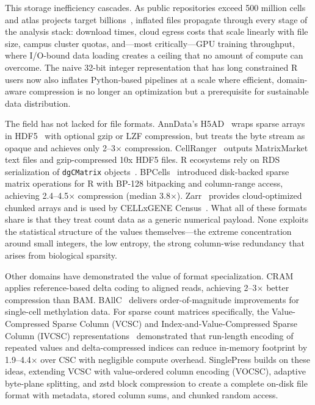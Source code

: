 \documentclass[10pt,twocolumn,letterpaper]{article}
\begin{document}
This storage inefficiency cascades.
As public repositories exceed 500 million cells~\cite{svensson2018exponential,regev2017human} and atlas projects target billions~\cite{chanzuckerberg2021cellxgene}, inflated files propagate through every stage of the analysis stack: download times, cloud egress costs that scale linearly with file size, campus cluster quotas, and---most critically---GPU training throughput, where I/O-bound data loading creates a ceiling that no amount of compute can overcome.
The naive 32-bit integer representation that has long constrained R users now also inflates Python-based pipelines at a scale where efficient, domain-aware compression is no longer an optimization but a prerequisite for sustainable data distribution.

The field has not lacked for file formats.
AnnData's H5AD~\cite{anndata} wraps sparse arrays in HDF5~\cite{folk2011overview} with optional gzip or LZF compression, but treats the byte stream as opaque and achieves only 2--3$\times$ compression.
CellRanger~\cite{zheng2017massively} outputs MatrixMarket~\cite{boisvert1997matrix} text files and gzip-compressed 10x HDF5 files.
R ecosystems rely on RDS serialization of \texttt{dgCMatrix} objects~\cite{amezquita2020orchestrating}.
BPCells~\cite{parks2024bpcells} introduced disk-backed sparse matrix operations for R with BP-128 bitpacking and column-range access, achieving 2.4--4.5$\times$ compression (median 3.8$\times$).
Zarr~\cite{miles2024zarr} provides cloud-optimized chunked arrays and is used by CELLxGENE Census~\cite{chanzuckerberg2021cellxgene}.
What all of these formats share is that they treat count data as a generic numerical payload.
None exploits the statistical structure of the values themselves---the extreme concentration around small integers, the low entropy, the strong column-wise redundancy that arises from biological sparsity.

Other domains have demonstrated the value of format specialization.
CRAM~\cite{bonfield2022cram} applies reference-based delta coding to aligned reads, achieving 2--3$\times$ better compression than BAM.
BAllC~\cite{tian2024ballc} delivers order-of-magnitude improvements for single-cell methylation data.
For sparse count matrices specifically, the Value-Compressed Sparse Column (VCSC) and Index-and-Value-Compressed Sparse Column (IVCSC) representations~\cite{wolfgang2024vcsc,ruiter2024vcsc,ruiter2024vcsc_dcc} demonstrated that run-length encoding of repeated values and delta-compressed indices can reduce in-memory footprint by 1.9--4.4$\times$ over CSC with negligible compute overhead.
SinglePress builds on these ideas, extending VCSC with value-ordered column encoding (VOCSC), adaptive byte-plane splitting, and zstd block compression to create a complete on-disk file format with metadata, stored column sums, and chunked random access.
\end{document}
